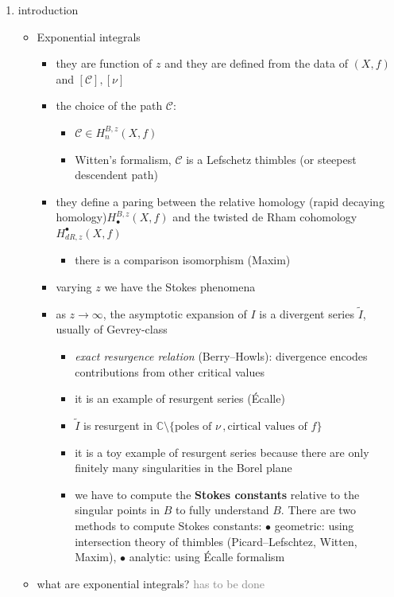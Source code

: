 \documentclass{article}
\theoremstyle{definition}
\newcommand{\C}{\mathbb{C}}
\begin{document}
\begin{enumerate}
\item introduction
\begin{itemize}
\item Exponential integrals
\begin{itemize}
\item they are function of $z$ and they are defined from the data of $(X,f)$ and $[\mathcal{C}], [\nu]$
\item the choice of the path $\mathcal{C}$: 
\begin{itemize}
\item $\mathcal{C}\in H^{B,z}_{n}(X,f)$
\item Witten's formalism, $\mathcal{C}$ is a Lefschetz thimbles (or steepest descendent path)
\end{itemize}
\item they define a paring between the relative homology (rapid decaying homology)$H^{B,z}_{\bullet}(X,f)$ and the twisted de Rham cohomology  $H_{dR,z}^{\bullet}(X,f)$
\begin{itemize}
\item there is a comparison isomorphism (Maxim)
\end{itemize}
\item varying $z$ we have the Stokes phenomena
\item as $z\to\infty$, the asymptotic expansion of $I$ is a divergent series $\tilde{I}$, usually of Gevrey-class
\begin{itemize}
\item {\it exact resurgence relation} (Berry--Howls): divergence encodes contributions from other critical values
\item it is an example of resurgent series (\'Ecalle)
\item $\tilde{I}$ is resurgent in $\C\setminus\lbrace \text{poles of } \nu\,, \text{cirtical values of } f\rbrace$
\item it is a toy example of resurgent series because there are only finitely many singularities in the Borel plane
\item we have to compute the \textbf{Stokes constants} relative to the singular points in $B$ to fully understand $B$. There are two methods to compute Stokes constants: $\bullet$ geometric: using intersection theory of thimbles (Picard--Lefschtez, Witten, Maxim), $\bullet$ analytic: using \'Ecalle formalism   
\end{itemize} 
\end{itemize}
\item what are exponential integrals? \textcolor{gray}{has to be done}

\end{itemize}
\end{enumerate}
\end{document}

